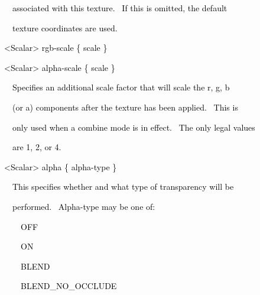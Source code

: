 \documentclass[a4paper]{article}
\newcommand\textstyleOOoComputerKeyWord[1]{\textrm{\textcolor[rgb]{0.0,0.0,0.5019608}{#1}}}
\begin{document}
{\color{black}
\textstyleOOoComputerKeyWord{\textcolor{black}{\ \ \ \ associated with this texture. \ If this is omitted, the
default}}}

{\color{black}
\textstyleOOoComputerKeyWord{\textcolor{black}{\ \ \ \ texture coordinates are used.}}}


\bigskip

{\color{black}
\textstyleOOoComputerKeyWord{\textcolor{black}{\ \ {\textless}Scalar{\textgreater} rgb-scale \{ scale \}}}}

{\color{black}
\textstyleOOoComputerKeyWord{\textcolor{black}{\ \ {\textless}Scalar{\textgreater} alpha-scale \{ scale \}}}}


\bigskip

{\color{black}
\textstyleOOoComputerKeyWord{\textcolor{black}{\ \ \ \ Specifies an additional scale factor that will scale the r, g,
b}}}

{\color{black}
\textstyleOOoComputerKeyWord{\textcolor{black}{\ \ \ \ (or a) components after the texture has been applied. \ This
is}}}

{\color{black}
\textstyleOOoComputerKeyWord{\textcolor{black}{\ \ \ \ only used when a combine mode is in effect. \ The only legal
values}}}

{\color{black}
\textstyleOOoComputerKeyWord{\textcolor{black}{\ \ \ \ are 1, 2, or 4.}}}


\bigskip

{\color{black}
\textstyleOOoComputerKeyWord{\textcolor{black}{\ \ {\textless}Scalar{\textgreater} alpha \{ alpha-type \}}}}


\bigskip

{\color{black}
\textstyleOOoComputerKeyWord{\textcolor{black}{\ \ \ \ This specifies whether and what type of transparency will be}}}

{\color{black}
\textstyleOOoComputerKeyWord{\textcolor{black}{\ \ \ \ performed. \ Alpha-type may be one of:}}}


\bigskip

{\color{black}
\textstyleOOoComputerKeyWord{\textcolor{black}{\ \ \ \ \ \ OFF}}}

{\color{black}
\textstyleOOoComputerKeyWord{\textcolor{black}{\ \ \ \ \ \ ON}}}

{\color{black}
\textstyleOOoComputerKeyWord{\textcolor{black}{\ \ \ \ \ \ BLEND}}}

\clearpage
\bigskip

{\color{black}
\textstyleOOoComputerKeyWord{\textcolor{black}{\ \ \ \ \ \ BLEND\_NO\_OCCLUDE}}}
\end{document}
